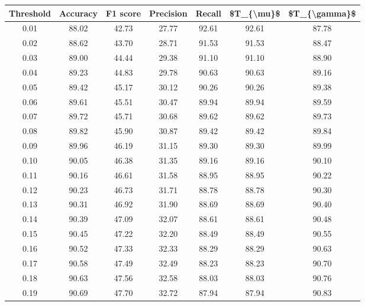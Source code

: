\begin{tabular}{|c|c|c|c|c|c|c|}
\hline
 Threshold &  Accuracy &  F1 score &  Precision &  Recall &  \$T\_\{\textbackslash mu\}\$ &  \$T\_\{\textbackslash gamma\}\$ \\
\hline
      0.01 &     88.02 &     42.73 &      27.77 &   92.61 &      92.61 &         87.78 \\
      0.02 &     88.62 &     43.70 &      28.71 &   91.53 &      91.53 &         88.47 \\
      0.03 &     89.00 &     44.44 &      29.38 &   91.10 &      91.10 &         88.90 \\
      0.04 &     89.23 &     44.83 &      29.78 &   90.63 &      90.63 &         89.16 \\
      0.05 &     89.42 &     45.17 &      30.12 &   90.26 &      90.26 &         89.38 \\
      0.06 &     89.61 &     45.51 &      30.47 &   89.94 &      89.94 &         89.59 \\
      0.07 &     89.72 &     45.71 &      30.68 &   89.62 &      89.62 &         89.73 \\
      0.08 &     89.82 &     45.90 &      30.87 &   89.42 &      89.42 &         89.84 \\
      0.09 &     89.96 &     46.19 &      31.15 &   89.30 &      89.30 &         89.99 \\
      0.10 &     90.05 &     46.38 &      31.35 &   89.16 &      89.16 &         90.10 \\
      0.11 &     90.16 &     46.61 &      31.58 &   88.95 &      88.95 &         90.22 \\
      0.12 &     90.23 &     46.73 &      31.71 &   88.78 &      88.78 &         90.30 \\
      0.13 &     90.31 &     46.92 &      31.90 &   88.69 &      88.69 &         90.40 \\
      0.14 &     90.39 &     47.09 &      32.07 &   88.61 &      88.61 &         90.48 \\
      0.15 &     90.45 &     47.22 &      32.20 &   88.49 &      88.49 &         90.55 \\
      0.16 &     90.52 &     47.33 &      32.33 &   88.29 &      88.29 &         90.63 \\
      0.17 &     90.58 &     47.49 &      32.49 &   88.23 &      88.23 &         90.70 \\
      0.18 &     90.63 &     47.56 &      32.58 &   88.03 &      88.03 &         90.76 \\
      0.19 &     90.69 &     47.70 &      32.72 &   87.94 &      87.94 &         90.83 \\

\end{tabular}
